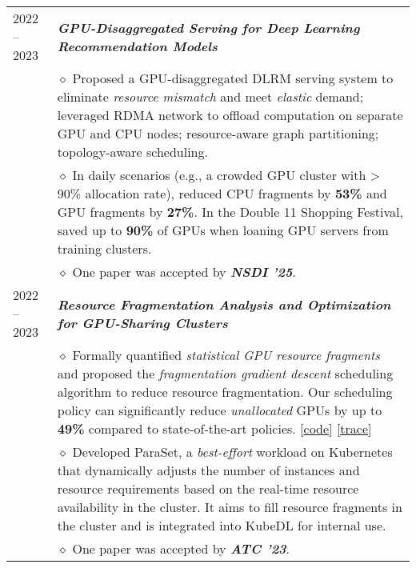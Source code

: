 \documentclass[letterpaper, 12pt]{article}
\begin{document}
\begin{longtable}{p{1.0in}p{5.8in}}
2022 -- 2023
& \textbf{\emph{GPU-Disaggregated Serving for Deep Learning Recommendation Models}} \\
    & $\diamond$ Proposed a GPU-disaggregated DLRM serving system to eliminate \textit{resource mismatch} and meet \textit{elastic} demand; leveraged RDMA network to offload computation on separate GPU and CPU nodes; resource-aware graph partitioning; topology-aware scheduling. \\
    & $\diamond$ In daily scenarios (e.g., a crowded GPU cluster with > 90\% allocation rate), reduced CPU fragments by \textbf{53\%} and GPU fragments by \textbf{27\%}. In the Double 11 Shopping Festival, saved up to \textbf{90\%} of GPUs when loaning GPU servers from training clusters. \\
    & $\diamond$ One paper was accepted by \textbf{\emph{NSDI '25}}. \\

2022 -- 2023
& \textbf{\emph{Resource Fragmentation Analysis and Optimization for GPU-Sharing Clusters}} \\
    & $\diamond$ Formally quantified \textit{statistical GPU resource fragments} and proposed the \textit{fragmentation gradient descent} scheduling algorithm to reduce resource fragmentation. Our scheduling policy can significantly reduce \textit{unallocated} GPUs by up to \textbf{49\%} compared to state-of-the-art policies. [\href{https://github.com/hkust-adsl/kubernetes-scheduler-simulator}{\underline{code}}] [\href{https://github.com/alibaba/clusterdata/tree/master/cluster-trace-gpu-v2023}{\underline{trace}}] \\
    & $\diamond$ Developed ParaSet, a \textit{best-effort} workload on Kubernetes that dynamically adjusts the number of instances and resource requirements based on the real-time resource availability in the cluster. It aims to fill resource fragments in the cluster and is integrated into KubeDL for internal use. \\
    & $\diamond$ One paper was accepted by \textbf{\emph{ATC '23}}. \\


\end{longtable}
\end{document}
